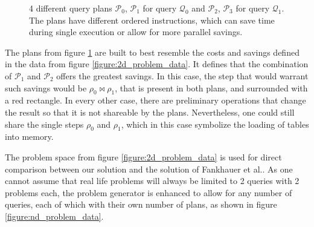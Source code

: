 \begin{figure}[!h]


    \caption{4 different query plans $\mathcal{P}_0$, $\mathcal{P}_1$ for query $\mathcal{Q}_0$ and $\mathcal{P}_2$, $\mathcal{P}_3$ for query $\mathcal{Q}_1$. The plans have different ordered instructions, which can save time during single execution or allow for more parallel savings.}
    \label{figure:4_query_plans}
\end{figure}

The plans from figure \ref{figure:4_query_plans} are built to best resemble the costs and savings defined in the data from figure \ref{figure:2d_problem_data}. It defines that the combination of $\mathcal{P}_1$ and $\mathcal{P}_2$ offers the greatest savings. In this case, the step that would warrant such savings would be $\rho_0\bowtie\rho_1$, that is present in both plans, and surrounded with a red rectangle. In every other case, there are preliminary operations that change the result so that it is not shareable by the plans. Nevertheless, one could still share the single steps $\rho_0$ and $\rho_1$, which in this case symbolize the loading of tables into memory. 

\newpage

The problem space from figure \ref{figure:2d_problem_data} is used for direct comparison between our solution and the solution of Fankhauer et al.\cite{fankhauser_multiple_2021}. As one cannot assume that real life problems will always be limited to 2 queries with 2 problems each, the problem generator is enhanced to allow for any number of queries, each of which with their own number of plans, as shown in figure \ref{figure:nd_problem_data}.

